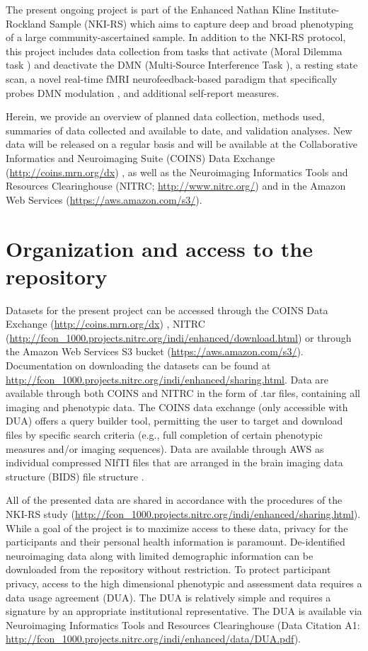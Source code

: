 The present ongoing project is part of the Enhanced Nathan Kline Institute-Rockland Sample (NKI-RS) \cite{Nooner2012} which aims to capture deep and broad phenotyping of a large community-ascertained sample. In addition to the NKI-RS protocol, this project includes data collection from tasks that activate (Moral Dilemma task \cite{Harrison2008}) and deactivate the DMN (Multi-Source Interference Task \cite{Bush2006}), a resting state scan, a novel real-time fMRI neurofeedback-based paradigm that specifically probes DMN modulation \cite{Craddock2012}, and additional self-report measures.

Herein, we provide an overview of planned data collection, methods used, summaries of data collected and available to date, and validation analyses. New data will be released on a regular basis and will be available at the Collaborative Informatics and Neuroimaging Suite (COINS) Data Exchange (\url{http://coins.mrn.org/dx}) \cite{Scott2011,Wood2014}, as well as the Neuroimaging Informatics Tools and Resources Clearinghouse (NITRC; \url{http://www.nitrc.org/}) and in the Amazon Web Services (\url{https://aws.amazon.com/s3/}).

\section{Organization and access to the repository}

Datasets for the present project can be accessed through the COINS Data Exchange (\url{http://coins.mrn.org/dx}) \cite{Scott2011,Wood2014}, NITRC (\url{http://fcon\_1000.projects.nitrc.org/indi/enhanced/download.html}) or through the Amazon Web Services S3 bucket (\url{https://aws.amazon.com/s3/}). Documentation on downloading the datasets can be found at \url{http://fcon\_1000.projects.nitrc.org/indi/enhanced/sharing.html}. Data are available through both COINS and NITRC in the form of .tar files, containing all imaging and phenotypic data. The COINS data exchange (only accessible with DUA) offers a query builder tool, permitting the user to target and download files by specific search criteria (e.g., full completion of certain phenotypic measures and/or imaging sequences). Data are available through AWS as individual compressed NIfTI files that are arranged in the brain imaging data structure (BIDS) file structure \cite{Gorgolewski2016}.

All of the presented data are shared in accordance with the procedures of the NKI-RS study (\url{http://fcon\_1000.projects.nitrc.org/indi/enhanced/sharing.html}). While a goal of the project is to maximize access to these data, privacy for the participants and their personal health information is paramount. De-identified neuroimaging data along with limited demographic information can be downloaded from the repository without restriction. To protect participant privacy, access to the high dimensional phenotypic and assessment data requires a data usage agreement (DUA). The DUA is relatively simple and requires a signature by an appropriate institutional representative. The DUA is available via Neuroimaging Informatics Tools and Resources Clearinghouse (Data Citation A1: \url{http://fcon\_1000.projects.nitrc.org/indi/enhanced/data/DUA.pdf}).

